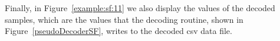 \vspace{+5pt}


\clearpage


Finally, in Figure~\ref{example:sf:11} we also display the values of the decoded samples, which are the values that the decoding routine, shown in Figure~\ref{pseudoDecoderSF}, writes to the decoded csv data file.


\vspace{+5pt}

